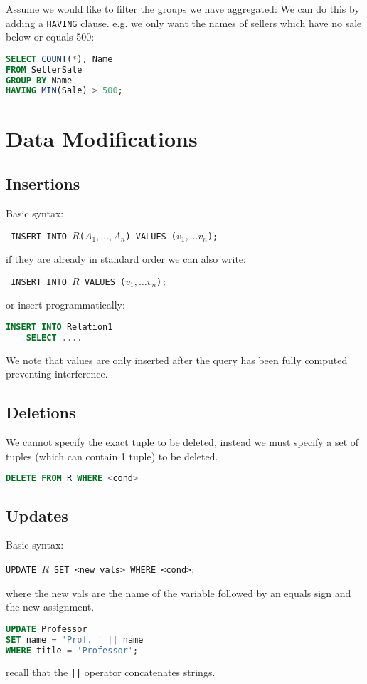\documentclass{sciposter}
\renewcommand{\t}[1]{\texttt{#1}}
\begin{document}
\begin{multicols}{3}
Assume we would like to filter the groups we have aggregated: We can do this by adding a \t{HAVING} clause. e.g. we only want the names of sellers which have no sale below or equals 500:

\begin{lstlisting}[language=SQL]
SELECT COUNT(*), Name
FROM SellerSale
GROUP BY Name
HAVING MIN(Sale) > 500;
\end{lstlisting}


\section*{Data Modifications}

\subsection*{Insertions}

Basic syntax:

\texttt{
INSERT INTO $R$($A_1,\ldots,A_n$) VALUES ($v_1,\ldots v_n$);
}

if they are already in standard order we can also write:

\texttt{
	INSERT INTO $R$ VALUES ($v_1,\ldots v_n$);
}

or insert programmatically:

\begin{lstlisting}[language=SQL]
INSERT INTO Relation1
	SELECT ....
\end{lstlisting}

We note that values are only inserted after the query has been fully computed preventing interference.

\subsection*{Deletions}
We cannot specify the exact tuple to be deleted, instead we must specify a set of tuples (which can contain 1 tuple) to be deleted.
\begin{lstlisting}[language=SQL]
DELETE FROM R WHERE <cond>
\end{lstlisting}

\subsection*{Updates}
Basic syntax:

\texttt{UPDATE $R$ SET <new vals> WHERE <cond>};

where the new vals are the name of the variable followed by an equals sign and the new assignment. 
\begin{lstlisting}[language=SQL]
UPDATE Professor
SET name = 'Prof. ' || name
WHERE title = 'Professor';
\end{lstlisting}
recall that the \t{||} operator concatenates strings.



\end{multicols}
\end{document}
